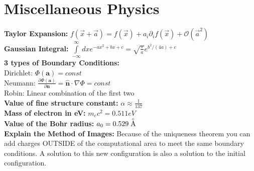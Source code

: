 \documentclass[12pt]{extarticle}
\renewcommand{\AA}{\buildrel _\circ \over {\mathrm{A}}}
\begin{document}
\section{Miscellaneous Physics}
\textbf{Taylor Expansion:} $f(\vec{x}+\vec{a}) = f(\vec{x}) + a_i\partial_i f(\vec{x}) + \mathcal{O}(\vec{a}^2)$ \\
\textbf{Gaussian Integral:} $\int\limits_{-\infty}^\infty dx e^{-ax^2+bx+c} = \sqrt{\frac{\pi}{a}}e^{b^2/(4a)+c}$ \\
\textbf{3 types of Boundary Conditions:} \\
Dirichlet: $\Phi(\mathbf{a}) = const$ \\
Neumann: $\frac{\partial \Phi(\mathbf{a})}{\partial \mathbf{n}} = \hat{\mathbf{n}}\cdot\nabla\Phi = const$ \\
Robin: Linear combination of the first two \\
\textbf{Value of fine structure constant:} $\alpha \approx \frac{1}{137}$ \\
\textbf{Mass of electron in eV:} $m_ec^2 = 0.511 eV$ \\
\textbf{Value of the Bohr radius:} $a_0 = 0.529 \AA$ \\
\textbf{Explain the Method of Images:} Because of the uniqueness theorem you can add charges OUTSIDE of the computational area to meet the same boundary conditions. A solution to this new configuration is also a solution to the initial configuration.
\end{document}
